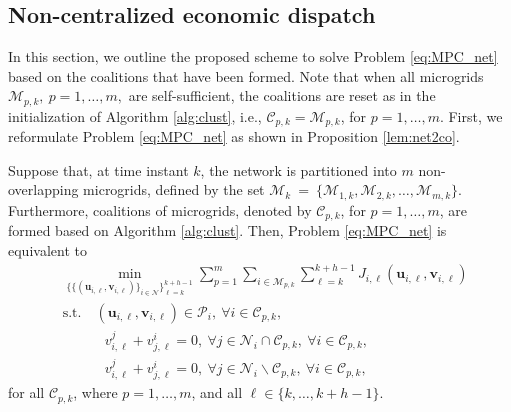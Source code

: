 \subsection{Non-centralized economic dispatch}
In this section, we outline the proposed scheme to solve Problem \eqref{eq:MPC_net} based on the coalitions that have been formed. Note that when all microgrids $\mathcal{M}_{p,k}, \ p=1,\dots,m,$ are self-sufficient, the coalitions are reset as in the initialization of Algorithm \ref{alg:clust}, i.e., $\mathcal{C}_{p,k}=\mathcal{M}_{p,k}$, for $p=1,\dots,m$. First, we reformulate Problem \eqref{eq:MPC_net} as shown in Proposition \ref{lem:net2co}.
\begin{prop}
	\label{lem:net2co}
	Suppose that, at time instant $k$, the network is partitioned into $m$ non-overlapping microgrids, defined by the set $\boldsymbol{\mathcal{M}}_k~=~\{\mathcal{M}_{1,k}, \mathcal{M}_{2,k}, \dots, \mathcal{M}_{m,k} \}$. Furthermore, coalitions of microgrids, denoted by $\mathcal{C}_{p,k}$, for $p=1,\dots,m$, are formed based on Algorithm \ref{alg:clust}. 
	Then, Problem \eqref{eq:MPC_net} is equivalent to
	\begin{subequations}
		\begin{align}
		&\min_{\{\{(\bm{u}_{i,\ell},\bm{v}_{i,\ell})\}_{i \in \mathcal{N}}\}_{\ell=k}^{k+h-1}}  \sum_{p=1}^{m} \sum_{i \in \mathcal{M}_{p,k}} \sum_{\ell =k}^{k+h-1}  J_{i,\ell}(\bm{u}_{i,\ell},\bm{v}_{i,\ell}) \label{eq:mg_cost_func}\\
		&\mathrm{s.t. }  
		\quad (\bm{u}_{i,\ell},\bm{v}_{i,\ell}) \in \mathcal{P}_i, \ \forall i \in \mathcal{C}_{p,k},  \label{eq:mg_loc_cons}\\
		&\qquad \quad v_{i,\ell}^j + v_{j,\ell}^i = 0, \ \forall j \in \mathcal{N}_i\cap\mathcal{C}_{p,k}, \  \forall i \in \mathcal{C}_{p,k},  \label{eq:mg_loc_cons2}\\
		&\qquad \quad v_{i,\ell}^j + v_{j,\ell}^i = 0, \ \forall j \in \mathcal{N}_i\backslash\mathcal{C}_{p,k}, \ \forall i \in \mathcal{C}_{p,k},  \label{eq:mg_coup_cons}
		\end{align}
		\label{eq:MPC_mg}%
	\end{subequations}
	for all $\mathcal{C}_{p,k}$, where $p=1,\dots,m$, and all $\ell \in\{k,\dots, k+h-1 \}$. \eod %
\end{prop}

